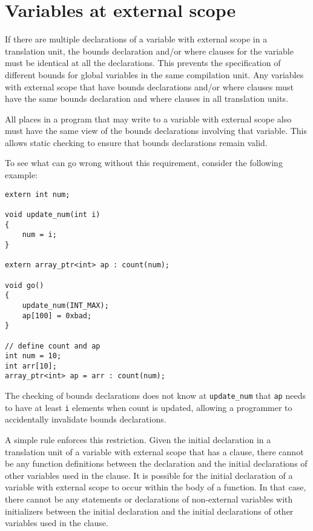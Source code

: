 \section{Variables at external scope}

If there are multiple declarations of a variable with external scope in
a translation unit, the bounds declaration and/or where clauses for the
variable must be identical at all the declarations. This prevents the
specification of different bounds for global variables in the same
compilation unit. Any variables with external scope that have bounds
declarations and/or where clauses must have the same bounds declaration
and where clauses in all translation units.

All places in a program that may write to a variable with external scope
also must have the same view of the bounds declarations involving that
variable. This allows static checking to ensure that bounds declarations
remain valid.

To see what can go wrong without this requirement, consider the
following example:

\begin{verbatim}
extern int num;

void update_num(int i)
{
    num = i;
}

extern array_ptr<int> ap : count(num);

void go()
{
    update_num(INT_MAX);
    ap[100] = 0xbad;
}

// define count and ap
int num = 10;
int arr[10];
array_ptr<int> ap = arr : count(num);
\end{verbatim}

The checking of bounds declarations does not know at
\texttt{update\_num} that \texttt{ap} needs to have at least \texttt{i}
elements when count is updated, allowing a programmer to accidentally
invalidate bounds declarations.

A simple rule enforces this restriction. Given the initial declaration
in a translation unit of a variable with external scope that has a
 clause, there cannot be any function definitions between
the declaration and the initial declarations of other variables used in
the  clause. It is possible for the initial declaration of
a variable with external scope to occur within the body of a function.
In that case, there cannot be any statements or declarations of
non-external variables with initializers between the initial declaration
and the initial declarations of other variables used in the
 clause.

